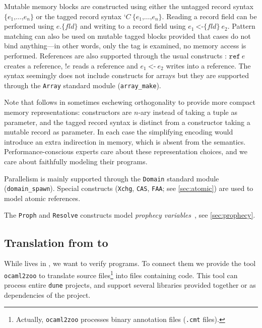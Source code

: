 Mutable memory blocks are constructed using either the untagged record syntax $\texttt{\{} e_1 \texttt{,} \dots \texttt{,} e_n \texttt{\}}$ or the tagged record syntax $\texttt{‘} C\ \texttt{\{} e_1 \texttt{,} \dots \texttt{,} e_n \texttt{\}}$.
Reading a record field can be performed using $e \texttt{.\{} \mathit{fld} \texttt{\}}$ and writing to a record field using $e_1\ \texttt{<-\{} \mathit{fld} \texttt{\}}\ e_2$.
Pattern matching can also be used on mutable tagged blocks provided that cases do not bind anything---in other words, only the tag is examined, no memory access is performed.
References are also supported through the usual constructs : $\texttt{ref}\ e$ creates a reference, $\texttt{!} e$ reads a reference and $e_1\ \texttt{<-}\ e_2$ writes into a reference.
The syntax seemingly does not include constructs for arrays but they are supported through the \texttt{Array} standard module (\eg \texttt{array\_make}).

Note that \ZooLang follows \OCaml in sometimes eschewing orthogonality to provide more compact memory representations: constructors are $n$-ary instead of taking a tuple as parameter, and the tagged record syntax is distinct from a constructor taking a mutable record as parameter. In each case the simplifying encoding would introduce an extra indirection in memory, which is absent from the \ZooLang semantics. Performance-conscious experts care about these representation choices, and we care about faithfully modeling their programs.

Parallelism is mainly supported through the \texttt{Domain} standard module (\eg \texttt{domain\_spawn}).
Special constructs (\texttt{Xchg}, \texttt{CAS}, \texttt{FAA}; see \cref{sec:atomic}) are used to model atomic references.

The \texttt{Proph} and \texttt{Resolve} constructs model \emph{prophecy variables}~\cite{DBLP:journals/pacmpl/JungLPRTDJ20}, see \cref{sec:prophecy}.

\subsection{Translation from \OCaml to \ZooLang}



While \ZooLang lives in \Rocq, we want to verify \OCaml programs.
To connect them we provide the tool \texttt{ocaml2zoo} to translate \OCaml source files\footnote{Actually, \texttt{ocaml2zoo} processes binary annotation files (\texttt{.cmt} files).} into \Rocq files containing \ZooLang code.
This tool can process entire \texttt{dune} projects, and support several libraries provided together or as dependencies of the project.

